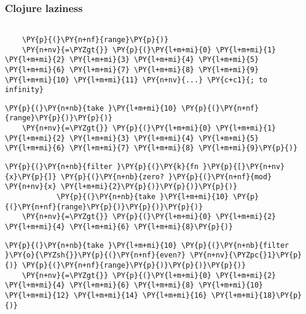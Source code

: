 \begin{frame}[fragile]
  \frametitle{Clojure laziness}
  \begin{Verbatim}[commandchars=\\\{\}]

    \PY{p}{(}\PY{n+nf}{range}\PY{p}{)}
    \PY{n+nv}{=\PYZgt{}} \PY{p}{(}\PY{l+m+mi}{0} \PY{l+m+mi}{1} \PY{l+m+mi}{2} \PY{l+m+mi}{3} \PY{l+m+mi}{4} \PY{l+m+mi}{5} \PY{l+m+mi}{6} \PY{l+m+mi}{7} \PY{l+m+mi}{8} \PY{l+m+mi}{9} \PY{l+m+mi}{10} \PY{l+m+mi}{11} \PY{n+nv}{...} \PY{c+c1}{; to infinity}
  \end{Verbatim}

  \pause

  \begin{Verbatim}[commandchars=\\\{\}]
    \PY{p}{(}\PY{n+nb}{take }\PY{l+m+mi}{10} \PY{p}{(}\PY{n+nf}{range}\PY{p}{)}\PY{p}{)}
    \PY{n+nv}{=\PYZgt{}} \PY{p}{(}\PY{l+m+mi}{0} \PY{l+m+mi}{1} \PY{l+m+mi}{2} \PY{l+m+mi}{3} \PY{l+m+mi}{4} \PY{l+m+mi}{5} \PY{l+m+mi}{6} \PY{l+m+mi}{7} \PY{l+m+mi}{8} \PY{l+m+mi}{9}\PY{p}{)}
  \end{Verbatim}

  \pause

  \begin{Verbatim}[commandchars=\\\{\}]
    \PY{p}{(}\PY{n+nb}{filter }\PY{p}{(}\PY{k}{fn }\PY{p}{[}\PY{n+nv}{x}\PY{p}{]} \PY{p}{(}\PY{n+nb}{zero? }\PY{p}{(}\PY{n+nf}{mod} \PY{n+nv}{x} \PY{l+m+mi}{2}\PY{p}{)}\PY{p}{)}\PY{p}{)}
            \PY{p}{(}\PY{n+nb}{take }\PY{l+m+mi}{10} \PY{p}{(}\PY{n+nf}{range}\PY{p}{)}\PY{p}{)}\PY{p}{)}
    \PY{n+nv}{=\PYZgt{}} \PY{p}{(}\PY{l+m+mi}{0} \PY{l+m+mi}{2} \PY{l+m+mi}{4} \PY{l+m+mi}{6} \PY{l+m+mi}{8}\PY{p}{)}
  \end{Verbatim}

  \pause

  \begin{Verbatim}[commandchars=\\\{\}]
    \PY{p}{(}\PY{n+nb}{take }\PY{l+m+mi}{10} \PY{p}{(}\PY{n+nb}{filter }\PY{o}{\PYZsh{}}\PY{p}{(}\PY{n+nf}{even?} \PY{n+nv}{\PYZpc{}1}\PY{p}{)} \PY{p}{(}\PY{n+nf}{range}\PY{p}{)}\PY{p}{)}\PY{p}{)}
    \PY{n+nv}{=\PYZgt{}} \PY{p}{(}\PY{l+m+mi}{0} \PY{l+m+mi}{2} \PY{l+m+mi}{4} \PY{l+m+mi}{6} \PY{l+m+mi}{8} \PY{l+m+mi}{10} \PY{l+m+mi}{12} \PY{l+m+mi}{14} \PY{l+m+mi}{16} \PY{l+m+mi}{18}\PY{p}{)}
  \end{Verbatim}
\end{frame}
